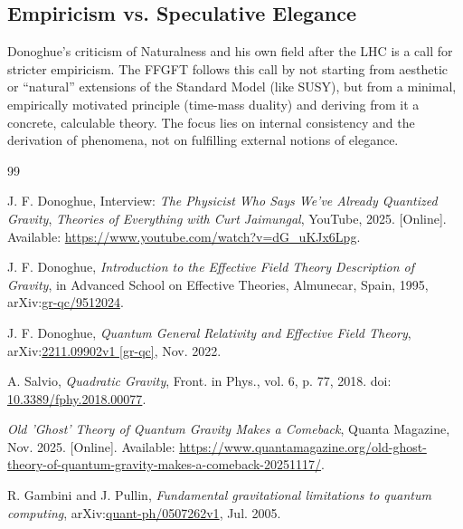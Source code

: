 	\subsection{Empiricism vs. Speculative Elegance}
	Donoghue's criticism of Naturalness and his own field after the LHC is a call for stricter empiricism. The FFGFT follows this call by not starting from aesthetic or ``natural'' extensions of the Standard Model (like SUSY), but from a minimal, empirically motivated principle (time-mass duality) and deriving from it a concrete, calculable theory. The focus lies on internal consistency and the derivation of phenomena, not on fulfilling external notions of elegance.
		\begin{thebibliography}{99}
	
	J. F. Donoghue,
	Interview: \emph{The Physicist Who Says We've Already Quantized Gravity},
	\textit{Theories of Everything with Curt Jaimungal}, YouTube, 2025.
	[Online]. Available: \href{https://www.youtube.com/watch?v=dG_uKJx6Lpg}{https://www.youtube.com/watch?v=dG\_uKJx6Lpg}.
	
	J. F. Donoghue,
	\emph{Introduction to the Effective Field Theory Description of Gravity},
	in Advanced School on Effective Theories, Almunecar, Spain, 1995,
	arXiv:\href{https://arxiv.org/abs/gr-qc/9512024}{gr-qc/9512024}.
	
	J. F. Donoghue,
	\emph{Quantum General Relativity and Effective Field Theory},
	arXiv:\href{https://arxiv.org/abs/2211.09902}{2211.09902v1 [gr-qc]}, Nov. 2022.
	
	A. Salvio,
	\emph{Quadratic Gravity},
	Front. in Phys., vol. 6, p. 77, 2018.
	doi: \href{https://doi.org/10.3389/fphy.2018.00077}{10.3389/fphy.2018.00077}.
	
	\emph{Old 'Ghost' Theory of Quantum Gravity Makes a Comeback},
	Quanta Magazine, Nov. 2025.
	[Online]. Available: \href{https://www.quantamagazine.org/old-ghost-theory-of-quantum-gravity-makes-a-comeback-20251117/}{https://www.quantamagazine.org/old-ghost-theory-of-quantum-gravity-makes-a-comeback-20251117/}.
	
	R. Gambini and J. Pullin,
	\emph{Fundamental gravitational limitations to quantum computing},
	arXiv:\href{https://arxiv.org/abs/quant-ph/0507262}{quant-ph/0507262v1}, Jul. 2005.
	

\end{thebibliography}
